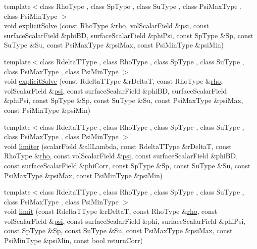 \begin{DoxyCompactItemize}
\item 
{\footnotesize template$<$class Rho\+Type , class Sp\+Type , class Su\+Type , class Psi\+Max\+Type , class Psi\+Min\+Type $>$ }\\void \hyperlink{namespaceFoam_1_1myMULES_adcc09177637dadb5c0559fc394677707}{explicit\+Solve} (const Rho\+Type \&\hyperlink{EEqn__1pl_8H_ac955f87ac2b79f02f420cae087fc52b1}{rho}, vol\+Scalar\+Field \&\hyperlink{UEqn__1pl_8H_a165a34deec3ee505598e511a88831968}{psi}, const surface\+Scalar\+Field \&phi\+BD, surface\+Scalar\+Field \&phi\+Psi, const Sp\+Type \&Sp, const Su\+Type \&Su, const Psi\+Max\+Type \&psi\+Max, const Psi\+Min\+Type \&psi\+Min)
\item 
{\footnotesize template$<$class Rdelta\+T\+Type , class Rho\+Type , class Sp\+Type , class Su\+Type , class Psi\+Max\+Type , class Psi\+Min\+Type $>$ }\\void \hyperlink{namespaceFoam_1_1myMULES_a87e110eac112b2759f9381066e701513}{explicit\+Solve} (const Rdelta\+T\+Type \&r\+DeltaT, const Rho\+Type \&\hyperlink{EEqn__1pl_8H_ac955f87ac2b79f02f420cae087fc52b1}{rho}, vol\+Scalar\+Field \&\hyperlink{UEqn__1pl_8H_a165a34deec3ee505598e511a88831968}{psi}, const surface\+Scalar\+Field \&phi\+BD, surface\+Scalar\+Field \&phi\+Psi, const Sp\+Type \&Sp, const Su\+Type \&Su, const Psi\+Max\+Type \&psi\+Max, const Psi\+Min\+Type \&psi\+Min)
\item 
{\footnotesize template$<$class Rdelta\+T\+Type , class Rho\+Type , class Sp\+Type , class Su\+Type , class Psi\+Max\+Type , class Psi\+Min\+Type $>$ }\\void \hyperlink{namespaceFoam_1_1myMULES_a8db4bd63b51f07fbea4b4d8a129868ac}{limiter} (scalar\+Field \&all\+Lambda, const Rdelta\+T\+Type \&r\+DeltaT, const Rho\+Type \&\hyperlink{EEqn__1pl_8H_ac955f87ac2b79f02f420cae087fc52b1}{rho}, const vol\+Scalar\+Field \&\hyperlink{UEqn__1pl_8H_a165a34deec3ee505598e511a88831968}{psi}, const surface\+Scalar\+Field \&phi\+BD, const surface\+Scalar\+Field \&phi\+Corr, const Sp\+Type \&Sp, const Su\+Type \&Su, const Psi\+Max\+Type \&psi\+Max, const Psi\+Min\+Type \&psi\+Min)
\item 
{\footnotesize template$<$class Rdelta\+T\+Type , class Rho\+Type , class Sp\+Type , class Su\+Type , class Psi\+Max\+Type , class Psi\+Min\+Type $>$ }\\void \hyperlink{namespaceFoam_1_1myMULES_a71d1731d21977db75d5f9bf2e880775f}{limit} (const Rdelta\+T\+Type \&r\+DeltaT, const Rho\+Type \&\hyperlink{EEqn__1pl_8H_ac955f87ac2b79f02f420cae087fc52b1}{rho}, const vol\+Scalar\+Field \&\hyperlink{UEqn__1pl_8H_a165a34deec3ee505598e511a88831968}{psi}, const surface\+Scalar\+Field \&phi, surface\+Scalar\+Field \&phi\+Psi, const Sp\+Type \&Sp, const Su\+Type \&Su, const Psi\+Max\+Type \&psi\+Max, const Psi\+Min\+Type \&psi\+Min, const bool return\+Corr)

\end{DoxyCompactItemize}
